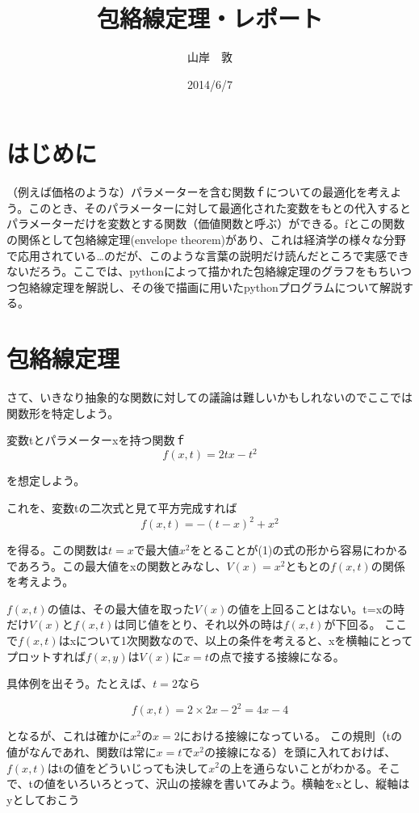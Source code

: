 \documentclass[11pt,a4j,fleqn]{jarticle}
\title{包絡線定理・レポート}
\author{山岸　敦}
\date{2014/6/7}
\begin{document}
\maketitle

\section{はじめに}

（例えば価格のような）パラメーターを含む関数ｆについての最適化を考えよう。このとき、そのパラメーターに対して最適化された変数をもとの代入するとパラメーターだけを変数とする関数（価値関数と呼ぶ）ができる。fとこの関数の関係として包絡線定理(envelope theorem)があり、これは経済学の様々な分野で応用されている…のだが、このような言葉の説明だけ読んだところで実感できないだろう。ここでは、pythonによって描かれた包絡線定理のグラフをもちいつつ包絡線定理を解説し、その後で描画に用いたpythonプログラムについて解説する。


\section{包絡線定理}

さて、いきなり抽象的な関数に対しての議論は難しいかもしれないのでここでは関数形を特定しよう。

変数tとパラメーターxを持つ関数ｆ
\[
f(x, t) =2 t x - t^2
\]

を想定しよう。

これを、変数tの二次式と見て平方完成すれば
\begin{equation}
f(x, t)  = -(t - x)^2 + x^2 \label{eq:square-1}
\end{equation}

を得る。この関数は$t=x$で最大値$x^2$をとることが(1)の式の形から容易にわかるであろう。この最大値をxの関数とみなし、$V(x)=x^2$ともとの$f(x,t)$の関係を考えよう。

$f(x,t)$の値は、その最大値を取った$V(x)$の値を上回ることはない。t=xの時だけ$V(x)$と$f(x,t)$は同じ値をとり、それ以外の時は$f(x,t)$が下回る。
ここで$f(x,t)$はxについて1次関数なので、以上の条件を考えると、xを横軸にとってプロットすれば$f(x,y)$は$V(x)$に$x=t$の点で接する接線になる。

具体例を出そう。たとえば、$t=2$なら

\begin{equation}
f(x, t) = 2×2x-2^2 = 4x-4
\end{equation}

となるが、これは確かに$x^2$の$x=2$における接線になっている。
この規則（tの値がなんであれ、関数fは常に$x=t$で$x^2$の接線になる）を頭に入れておけば、$f(x,t)$はtの値をどういじっても決して$x^2$の上を通らないことがわかる。そこで、tの値をいろいろとって、沢山の接線を書いてみよう。横軸をxとし、縦軸はyとしておこう
\end{document}
